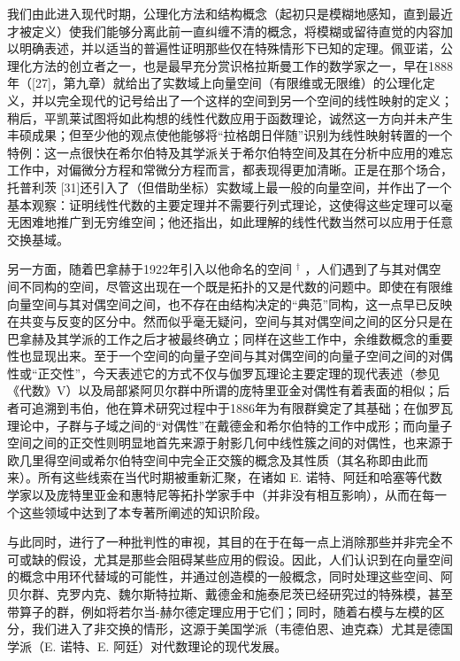 我们由此进入现代时期，公理化方法和结构概念（起初只是模糊地感知，直到最近才被定义）使我们能够分离此前一直纠缠不清的概念，将模糊或留待直觉的内容加以明确表述，并以适当的普遍性证明那些仅在特殊情形下已知的定理。佩亚诺，公理化方法的创立者之一，也是最早充分赏识格拉斯曼工作的数学家之一，早在1888年（{[}27{]}，第九章）就给出了实数域上向量空间（有限维或无限维）的公理化定义，并以完全现代的记号给出了一个这样的空间到另一个空间的线性映射的定义；稍后，平凯莱试图将如此构想的线性代数应用于函数理论，诚然这一方向并未产生丰硕成果；但至少他的观点使他能够将“拉格朗日伴随”识别为线性映射转置的一个特例：这一点很快在希尔伯特及其学派关于希尔伯特空间及其在分析中应用的难忘工作中，对偏微分方程和常微分方程而言，都表现得更加清晰。正是在那个场合，托普利茨 {[}31{]}还引入了（但借助坐标）实数域上最一般的向量空间，并作出了一个基本观察：证明线性代数的主要定理并不需要行列式理论，这使得这些定理可以毫无困难地推广到无穷维空间；他还指出，如此理解的线性代数当然可以应用于任意交换基域。

另一方面，随着巴拿赫于1922年引入以他命名的空间 \(^{\dagger}\) ，人们遇到了与其对偶空间不同构的空间，尽管这出现在一个既是拓扑的又是代数的问题中。即使在有限维向量空间与其对偶空间之间，也不存在由结构决定的“典范”同构，这一点早已反映在共变与反变的区分中。然而似乎毫无疑问，空间与其对偶空间之间的区分只是在巴拿赫及其学派的工作之后才被最终确立；同样在这些工作中，余维数概念的重要性也显现出来。至于一个空间的向量子空间与其对偶空间的向量子空间之间的对偶性或“正交性”，今天表述它的方式不仅与伽罗瓦理论主要定理的现代表述（参见《代数》V）以及局部紧阿贝尔群中所谓的庞特里亚金对偶性有着表面的相似；后者可追溯到韦伯，他在算术研究过程中于1886年为有限群奠定了其基础；在伽罗瓦理论中，子群与子域之间的“对偶性”在戴德金和希尔伯特的工作中成形；而向量子空间之间的正交性则明显地首先来源于射影几何中线性簇之间的对偶性，也来源于欧几里得空间或希尔伯特空间中完全正交簇的概念及其性质（其名称即由此而来）。所有这些线索在当代时期被重新汇聚，在诸如
E. 诺特、阿廷和哈塞等代数学家以及庞特里亚金和惠特尼等拓扑学家手中（并非没有相互影响），从而在每一个这些领域中达到了本专著所阐述的知识阶段。

与此同时，进行了一种批判性的审视，其目的在于在每一点上消除那些并非完全不可或缺的假设，尤其是那些会阻碍某些应用的假设。因此，人们认识到在向量空间的概念中用环代替域的可能性，并通过创造模的一般概念，同时处理这些空间、阿贝尔群、克罗内克、魏尔斯特拉斯、戴德金和施泰尼茨已经研究过的特殊模，甚至带算子的群，例如将若尔当-赫尔德定理应用于它们；同时，随着右模与左模的区分，我们进入了非交换的情形，这源于美国学派（韦德伯恩、迪克森）尤其是德国学派（E. 诺特、E. 阿廷）对代数理论的现代发展。

